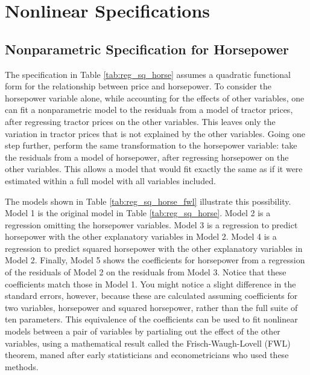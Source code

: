 \documentclass[11pt]{paper}
\begin{document}
\clearpage
\section{Nonlinear Specifications}


\subsection{Nonparametric Specification for Horsepower}


The specification in 
Table \ref{tab:reg_sq_horse}
assumes a quadratic functional form for
the relationship between price and horsepower. 
To consider the horsepower variable alone, 
while accounting for the effects of other variables, 
one can fit a nonparametric model to the residuals 
from a model of tractor prices, 
after regressing tractor prices on the other variables. 
This leaves only the variation in tractor prices that is not explained by the other variables. 
Going one step further, perform the same transformation to the horsepower variable:
take the residuals from a model of horsepower, 
after regressing horsepower on the other variables. 
This allows a model that would fit exactly the same as if it were estimated within a full model with all variables included. 

The models shown in
Table \ref{tab:reg_sq_horse_fwl}
illustrate this possibility. 
Model 1 is the original model in 
Table \ref{tab:reg_sq_horse}. 
Model 2 is a regression omitting the horsepower variables. 
Model 3 is a regression to predict horsepower with the other explanatory variables in Model 2.
Model 4 is a regression to predict squared horsepower with the other explanatory variables in Model 2.
Finally, Model 5 shows the coefficients for horsepower
from a regression of the residuals of Model 2
on the residuals from Model 3. 
Notice that these coefficients match those in Model 1. 
You might notice a slight difference in the standard errors, however, 
because these are calculated assuming coefficients 
for two variables, horsepower and squared horsepower,
rather than the full suite of ten parameters.
This equivalence of the coefficients can be used to fit
nonlinear models between a pair of variables by 
partialing out the effect of the other variables, 
using a mathematical result called the Frisch-Waugh-Lovell (FWL) theorem, 
maned after early statisticians and econometricians who used these methods. 


\end{document}
